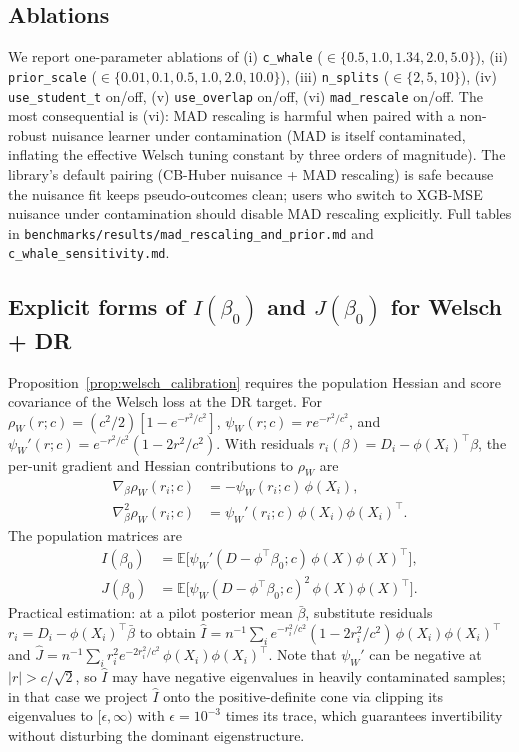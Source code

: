 \subsection{Ablations}
\label{app:ablations}
We report one-parameter ablations of (i) \texttt{c\_whale}
($\in \{0.5, 1.0, 1.34, 2.0, 5.0\}$), (ii) \texttt{prior\_scale}
($\in \{0.01, 0.1, 0.5, 1.0, 2.0, 10.0\}$), (iii) \texttt{n\_splits}
($\in \{2, 5, 10\}$), (iv) \texttt{use\_student\_t} on/off,
(v) \texttt{use\_overlap} on/off, (vi) \texttt{mad\_rescale} on/off.
The most consequential is (vi): MAD rescaling is harmful when
paired with a non-robust nuisance learner under contamination
(MAD is itself contaminated, inflating the effective Welsch
tuning constant by three orders of magnitude). The library's
default pairing (CB-Huber nuisance + MAD rescaling) is safe
because the nuisance fit keeps pseudo-outcomes clean; users who
switch to XGB-MSE nuisance under contamination should disable MAD
rescaling explicitly. Full tables in
\texttt{benchmarks/results/mad\_rescaling\_and\_prior.md} and
\texttt{c\_whale\_sensitivity.md}.

\subsection{\texorpdfstring{Explicit forms of $I(\beta_0)$ and $J(\beta_0)$ for Welsch + DR}{Explicit forms of I(beta\_0) and J(beta\_0) for Welsch + DR}}
\label{app:I_J_formulas}
Proposition~\ref{prop:welsch_calibration} requires the population
Hessian and score covariance of the Welsch loss at the DR target.
For $\rho_W(r; c) = (c^2/2)[1 - e^{-r^2/c^2}]$,
$\psi_W(r; c) = r e^{-r^2/c^2}$, and
$\psi_W'(r; c) = e^{-r^2/c^2}(1 - 2r^2/c^2)$. With residuals
$r_i(\beta) = D_i - \phi(X_i)^\top \beta$, the per-unit gradient and
Hessian contributions to $\rho_W$ are
\begin{align}
\nabla_\beta \rho_W(r_i; c) &= -\psi_W(r_i; c)\, \phi(X_i), \\
\nabla^2_\beta \rho_W(r_i; c) &= \psi_W'(r_i; c)\, \phi(X_i)
\phi(X_i)^\top.
\end{align}
The population matrices are
\begin{align}
I(\beta_0) &= \mathbb{E}\big[ \psi_W'(D - \phi^\top \beta_0; c)\,
\phi(X) \phi(X)^\top \big], \\
J(\beta_0) &= \mathbb{E}\big[ \psi_W(D - \phi^\top \beta_0; c)^2\,
\phi(X) \phi(X)^\top \big].
\end{align}
Practical estimation: at a pilot posterior mean $\bar\beta$,
substitute residuals $r_i = D_i - \phi(X_i)^\top \bar\beta$ to obtain
$\widehat I = n^{-1} \sum_i e^{-r_i^2/c^2}(1 - 2 r_i^2/c^2)\,
\phi(X_i)\phi(X_i)^\top$ and
$\widehat J = n^{-1} \sum_i r_i^2 e^{-2 r_i^2/c^2}\,
\phi(X_i)\phi(X_i)^\top$. Note that $\psi_W'$ can be negative at
$|r| > c/\sqrt{2}$, so $\widehat I$ may have negative eigenvalues
in heavily contaminated samples; in that case we project
$\widehat I$ onto the positive-definite cone via clipping its
eigenvalues to $[\epsilon, \infty)$ with $\epsilon = 10^{-3}$
times its trace, which guarantees invertibility without disturbing
the dominant eigenstructure.

